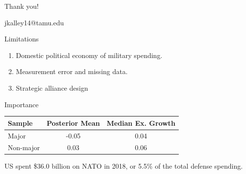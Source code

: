 \documentclass{beamer}
\begin{document}

 \begin{frame}[standout]

Thank you! 

jkalley14@tamu.edu

 \end{frame}



\appendix 



\begin{frame}{Limitations}

\begin{enumerate}
\item Domestic political economy of military spending. 
\pause 
\item Measurement error and missing data. 
\pause 
\item Strategic alliance design
\end{enumerate}

\end{frame}


\begin{frame}[standout]{Importance} 

\begin{tabular}{lcc}
Sample & Posterior Mean & Median Ex. Growth \\
\hline
Major & -0.05 & 0.04 \\
Non-major & 0.03 & 0.06  \\
\end{tabular}


US spent \$36.0 billion on NATO in 2018, or 5.5\% of the total defense spending. 


\end{frame}

\end{document}

